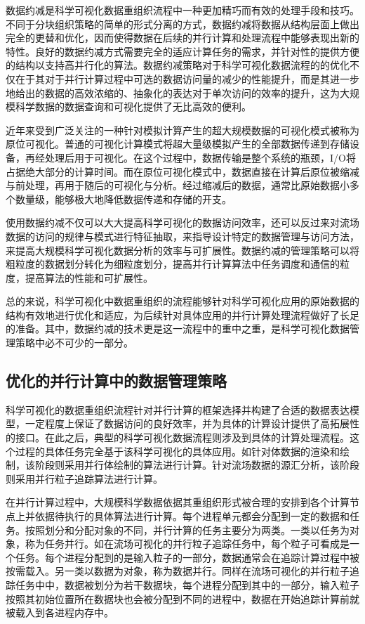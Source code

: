数据约减是科学可视化数据重组织流程中一种更加精巧而有效的处理手段和技巧。不同于分块组织策略的简单的形式分离的方式，数据约减将数据从结构层面上做出完全的更替和优化，因而使得数据在后续的并行计算和处理流程中能够表现出新的特性。良好的数据约减方式需要完全的适应计算任务的需求，并针对性的提供方便的结构以支持高并行化的算法。数据约减策略对于科学可视化数据流程的的优化不仅在于其对于并行计算过程中可选的数据访问量的减少的性能提升，而是其进一步地给出的数据的高效浓缩的、抽象化的表达对于单次访问的效率的提升，这为大规模科学数据的数据查询和可视化提供了无比高效的便利。

近年来受到广泛关注的一种针对模拟计算产生的超大规模数据的可视化模式被称为原位可视化。普通的可视化计算模式将超大量级模拟产生的全部数据传递到存储设备，再经处理后用于可视化。在这个过程中，数据传输是整个系统的瓶颈，I/O将占据绝大部分的计算时间。而在原位可视化模式中，数据直接在计算后原位被缩减与前处理，再用于随后的可视化与分析。经过缩减后的数据，通常比原始数据小多个数量级，能够极大地降低数据传递和存储的开支。

使用数据约减不仅可以大大提高科学可视化的数据访问效率，还可以反过来对流场数据的访问的规律与模式进行特征抽取，来指导设计特定的数据管理与访问方法，来提高大规模科学可视化数据分析的效率与可扩展性。数据约减的管理策略可以将粗粒度的数据划分转化为细粒度划分，提高并行计算算法中任务调度和通信的粒度，提高算法的性能和可扩展性。

总的来说，科学可视化中数据重组织的流程能够针对科学可视化应用的原始数据的结构有效地进行优化和适应，为后续针对具体应用的并行计算处理流程做好了长足的准备。其中，数据约减的技术更是这一流程中的重中之重，是科学可视化数据管理策略中必不可少的一部分。

\subsection{优化的并行计算中的数据管理策略}
科学可视化的数据重组织流程针对并行计算的框架选择并构建了合适的数据表达模型，一定程度上保证了数据访问的良好效率，并为具体的计算设计提供了高拓展性的接口。在此之后，典型的科学可视化数据流程则涉及到具体的计算处理流程。这个过程的具体任务完全基于该科学可视化的具体应用。如针对体数据的渲染和绘制，该阶段则采用并行体绘制的算法进行计算。针对流场数据的源汇分析，该阶段则采用并行粒子追踪算法进行计算。

在并行计算过程中，大规模科学数据依据其重组织形式被合理的安排到各个计算节点上并依据待执行的具体算法进行计算。每个进程单元都会分配到一定的数据和任务。按照划分和分配对象的不同，并行计算的任务主要分为两类。一类以任务为对象，称为任务并行。如在流场可视化的并行粒子追踪任务中，每个粒子可看成是一个任务。每个进程分配到的是输入粒子的一部分，数据通常会在追踪计算过程中被按需载入。另一类以数据为对象，称为数据并行。同样在流场可视化的并行粒子追踪任务中中，数据被划分为若干数据块，每个进程分配到其中的一部分，输入粒子按照其初始位置所在数据块也会被分配到不同的进程中，数据在开始追踪计算前就被载入到各进程内存中。

